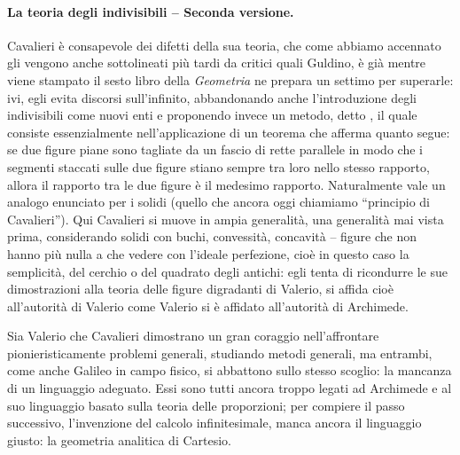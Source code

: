 \paragraph{La teoria degli indivisibili -- Seconda versione.} Cavalieri \`e consapevole dei difetti della sua teoria, che come abbiamo accennato gli vengono anche sottolineati pi\`u tardi da critici quali Guldino, \`e gi\`a mentre viene stampato il sesto libro della \textit{Geometria} ne prepara un settimo per superarle: ivi, egli evita discorsi sull'infinito, abbandonando anche l'introduzione degli indivisibili come nuovi enti e proponendo invece un metodo, detto , il quale consiste essenzialmente nell'applicazione di un teorema che afferma quanto segue: se due figure piane sono tagliate da un fascio di rette parallele in modo che i segmenti staccati sulle due figure stiano sempre tra loro nello stesso rapporto, allora il rapporto tra le due figure \`e il medesimo rapporto. Naturalmente vale un analogo enunciato per i solidi (quello che ancora oggi chiamiamo ``principio di Cavalieri''). Qui Cavalieri si muove in ampia generalit\`a, una generalit\`a mai vista prima, considerando solidi con buchi, convessit\`a, concavit\`a -- figure che non hanno pi\`u nulla a che vedere con l'ideale perfezione, cio\`e in questo caso la semplicit\`a, del cerchio o del quadrato degli antichi: egli tenta di ricondurre le sue dimostrazioni alla teoria delle figure digradanti di Valerio, si affida cio\`e all'autorit\`a di Valerio come Valerio si \`e affidato all'autorit\`a di Archimede.
\par Sia Valerio che Cavalieri dimostrano un gran coraggio nell'affrontare pionieristicamente problemi generali, studiando metodi generali, ma entrambi, come anche Galileo in campo fisico, si abbattono sullo stesso scoglio: la mancanza di un linguaggio adeguato. Essi sono tutti ancora troppo legati ad Archimede e al suo linguaggio basato sulla teoria delle proporzioni; per compiere il passo successivo, l'invenzione del calcolo infinitesimale, manca ancora il linguaggio giusto: la geometria analitica di Cartesio.
